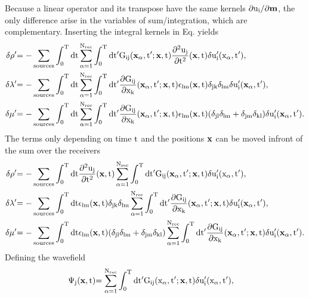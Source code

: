 Because a linear operator and its transpose have the same kernels $\rm{\partial u_i/\partial \mathbf{m}}$, the only difference arise in the variables of sum/integration, which are complementary. Inserting the integral kernels  in Eq. yields  
\begin{equation} 
\begin{split}
\rm{\delta \rho'} &\rm{= - \sum_{sources} \int_0^T dt \sum_{\alpha=1}^{\rm{N_{rec}}} \int_0^T dt' G_{ij}(\mathbf{x_\alpha},t';\mathbf{x},t) \frac{\partial^2 u_j}{\partial t^2}(\mathbf{x},t) \delta u_i'(x_\alpha,t'),}\\
\rm{\delta \lambda'} &\rm{= - \sum_{sources} \int_0^T dt \sum_{\alpha=1}^{\rm{N_{rec}}} \int_0^T dt' \frac{\partial G_{ij}}{\partial x_k}(\mathbf{x_\alpha},t';\mathbf{x},t) \epsilon_{lm}(\mathbf{x},t) \delta_{jk} \delta_{lm} \delta u_i'(\mathbf{x_\alpha},t'),}\\
\rm{\delta \mu'} &\rm{= - \sum_{sources} \int_0^T dt \sum_{\alpha=1}^{\rm{N_{rec}}} \int_0^T dt' \frac{\partial G_{ij}}{\partial x_k}(\mathbf{x_\alpha},t';\mathbf{x},t) \epsilon_{lm}(\mathbf{x},t) (\delta_{jl} \delta_{lm} + \delta_{jm} \delta_{kl}) \delta u_i'(\mathbf{x_\alpha},t').} \notag
\end{split} 
\end{equation} 
The terms only depending on time $\rm{t}$ and the positions $\rm{\mathbf{x}}$ can be moved infront of the sum over the receivers
\begin{equation} 
\begin{split}
\rm{\delta \rho'} &\rm{= - \sum_{sources} \int_0^T dt \frac{\partial^2 u_j}{\partial t^2}(\mathbf{x},t) \sum_{\alpha=1}^{\rm{N_{rec}}} \int_0^T dt' G_{ij}(\mathbf{x_\alpha},t';\mathbf{x},t) \delta u_i'(x_\alpha,t'),}\\
\rm{\delta \lambda'} &\rm{= - \sum_{sources} \int_0^T dt \epsilon_{lm}(\mathbf{x},t) \delta_{jk} \delta_{lm} \sum_{\alpha=1}^{\rm{N_{rec}}} \int_0^T dt' \frac{\partial G_{ij}}{\partial x_k}(\mathbf{x_\alpha},t';\mathbf{x},t) \delta u_i'(\mathbf{x_\alpha},t'),}\\
\rm{\delta \mu'} &\rm{= - \sum_{sources} \int_0^T dt \epsilon_{lm}(\mathbf{x},t) (\delta_{jl} \delta_{lm} + \delta_{jm} \delta_{kl}) \sum_{\alpha=1}^{\rm{N_{rec}}} \int_0^T dt' \frac{\partial G_{ij}}{\partial x_k}(\mathbf{x_\alpha},t';\mathbf{x},t) \delta u_i'(\mathbf{x_\alpha},t').}
\end{split} 
\label{A3:10}
\end{equation} 
Defining the wavefield 
\begin{equation} 
\begin{split}
\rm{\Psi_j (\mathbf{x},t)} &\rm{= \sum_{\alpha=1}^{\rm{N_{rec}}} \int_0^T dt' G_{ij}(x_\alpha,t';\mathbf{x},t) \delta u_i'(x_\alpha,t'),}
\end{split} 
\label{A3:20}
\end{equation}
